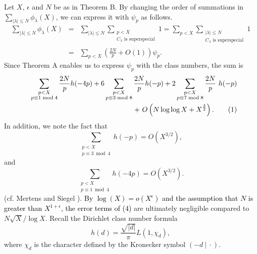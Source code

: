 \documentclass[a4paper, 11pt]{article}
\theoremstyle{plain}
\newcommand{\?}{\textcolor{red}{??}}
\newcommand{\lm}{\lambda}
\begin{document}
Let $X$, $\epsilon$ and $N$ be as in Theorem B. By changing the order of summations in $\sum_{|\lm| \le N} {\phi}_{\lm}(X)$, we can express it with ${\psi}_{p}$ as follows. 
\begin{eqnarray*}
    \sum_{|\lm| \le N} {\phi}_{\lm}(X) &=&  \sum_{|\lm| \le N} \sum_{\substack{p < X \\  C_{\lm} \text{ is superspecial} }} 1 
= \sum_{p < X} \sum_{\substack{|\lm| \le N \\ C_{\lm} \text{ is superspecial} }} 1 \\
&=& \sum_{p < X}   \left( \frac{2N}{p} +O(1)  \right) {\psi}_{p} . 
\end{eqnarray*}
Since Theorem A enables us to express ${\psi}_{p}$ with the class numbers, the sum is 
\begin{align*}
\label{anaeq1}
   && \sum_{\substack{p<X \\ p \equiv 1 \bmod 4}} \frac{2N}{p} h(-4p) + 6 \sum_{\substack{p<X \\ p  \equiv 3 \bmod 8}} \frac{2N}{p} h(-p) + 2\sum_{\substack{p<X \\ p \equiv 7 \bmod 8}} \frac{2N}{p} \ h(-p) \\
   && +\  O \left( N \log \log X + X^{\frac{3}{2}} \right) .
    \stepcounter{equation}\tag{\theequation}
\end{align*}
In addition, we note the fact that 
\[
 \sum_{\substack{p<X \\ p \equiv3  \bmod 4}}h(-p)=O(X^{3/2}),
\] and
\[
 \sum_{\substack{p<X \\ p \equiv 1 \bmod 4}}h(-4p)=O(X^{3/2}).
 \]
(cf. Mertens \cite{FM} and  Siegel \cite{SI}). \textcolor{black}{By $\log (X) = o(X^\epsilon)$ and the assumption that $N$ is greater than $X^{1+\epsilon}$, the error terms of (4)} are ultimately negligible compared to $N \sqrt{X}/ \log X$. 
Recall the Dirichlet class number formula
\[
h(d)=\frac{\sqrt{|d|}}{ \pi}L(1,{\chi}_{d}),
\]
where $\chi_d$ is the character defined by the Kronecker symbol $(-d\ |\ \cdot)$.
\end{document}
